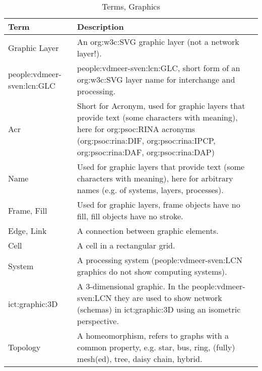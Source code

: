 \begin{table}[H]
    \caption{Terms, Graphics}
    \label{tab:terms:graphics}
    \centering
    \begin{tabular}{p{} p{}}
        \toprule
        \textbf{Term} & \textbf{Description}\\
        \toprule

        Graphic Layer &
        An \acs{org:w3c:SVG} graphic layer (not a network layer!).
        \index{SVG}
        \\

        \acs{people:vdmeer-sven:lcn:GLC} &
        \acl{people:vdmeer-sven:lcn:GLC}, short form of an \acs{org:w3c:SVG} layer name for interchange and processing.
        \\
        \midrule

        Acr &
        Short for Acronym, used for graphic layers that provide text (some characters with meaning),
        here for \acs{org:psoc:RINA} acronyms (\acs{org:psoc:rina:DIF}, \acs{org:psoc:rina:IPCP}, \acs{org:psoc:rina:DAF}, \acs{org:psoc:rina:DAP})
        \\

        Name &
        Used for graphic layers that provide text (some characters with meaning),
        here for arbitrary names (e.g. of systems, layers, processes).
        \\

        Frame, Fill &
        Used for graphic layers, frame objects have no fill, fill objects have no stroke.
        \\

        Edge, Link &
        A connection between graphic elements.
        \\

        Cell &
        A cell in a rectangular grid.
        \\

        System &
        A processing system (\ac{people:vdmeer-sven:LCN} graphics do not show computing systems).
        \\

        \acs{ict:graphic:3D} &
        A 3-dimensional graphic.
        In the \ac{people:vdmeer-sven:LCN} they are used to show network (schemas) in \acs{ict:graphic:3D} using an isometric perspective.
        \\

        \midrule
        Topology &
        A homeomorphism, refers to graphs with a common property, e.g. star, bus, ring, (fully) mesh(ed), tree, daisy chain, hybrid.
        \\

        \toprule
    \end{tabular}
\end{table}
